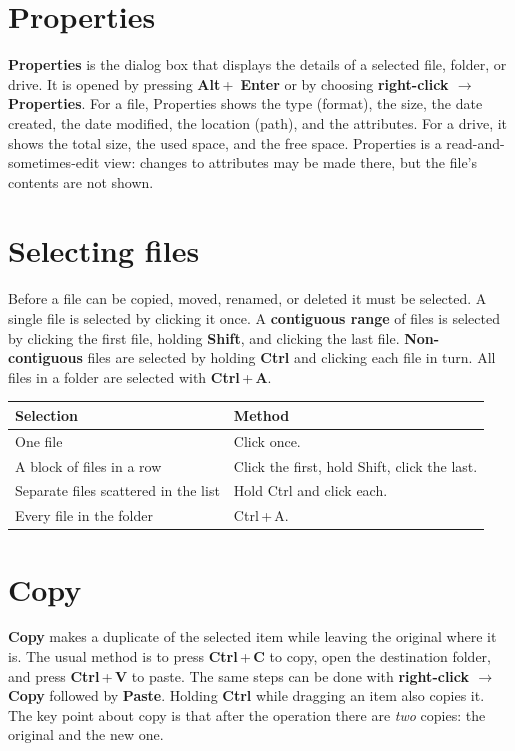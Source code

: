 \documentclass[11pt]{article}
\begin{document}
\section{Properties}
\textbf{Properties} is the dialog box that displays the details of a selected
file, folder, or drive. It is opened by pressing \textbf{Alt}\,+\,
\textbf{Enter} or by choosing \textbf{right-click $\rightarrow$ Properties}.
For a file, Properties shows the type (format), the size, the date created,
the date modified, the location (path), and the attributes. For a drive, it
shows the total size, the used space, and the free space. Properties is a
read-and-sometimes-edit view: changes to attributes may be made there, but
the file's contents are not shown.

\section{Selecting files}
Before a file can be copied, moved, renamed, or deleted it must be selected.
A single file is selected by clicking it once. A \textbf{contiguous range} of
files is selected by clicking the first file, holding \textbf{Shift}, and
clicking the last file. \textbf{Non-contiguous} files are selected by holding
\textbf{Ctrl} and clicking each file in turn. All files in a folder are
selected with \textbf{Ctrl}\,+\,\textbf{A}.

\begin{center}
\begin{tabular}{p{}p{}}
\toprule
\textbf{Selection} & \textbf{Method} \\
\midrule
One file & Click once. \\
A block of files in a row & Click the first, hold Shift, click the last. \\
Separate files scattered in the list & Hold Ctrl and click each. \\
Every file in the folder & Ctrl\,+\,A. \\
\bottomrule
\end{tabular}
\end{center}

\section{Copy}
\textbf{Copy} makes a duplicate of the selected item while leaving the
original where it is. The usual method is to press \textbf{Ctrl}\,+\,\textbf{C}
to copy, open the destination folder, and press \textbf{Ctrl}\,+\,\textbf{V}
to paste. The same steps can be done with \textbf{right-click $\rightarrow$
Copy} followed by \textbf{Paste}. Holding \textbf{Ctrl} while dragging an
item also copies it. The key point about copy is that after the operation
there are \emph{two} copies: the original and the new one.
\end{document}

